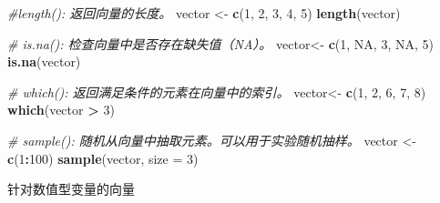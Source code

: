 \documentclass[]{book}
\newenvironment{Shaded}{\begin{snugshade}}{\end{snugshade}}
\newcommand{\CommentTok}[1]{\textcolor[rgb]{0.56,0.35,0.01}{\textit{#1}}}
\newcommand{\DataTypeTok}[1]{\textcolor[rgb]{0.13,0.29,0.53}{#1}}
\newcommand{\DecValTok}[1]{\textcolor[rgb]{0.00,0.00,0.81}{#1}}
\newcommand{\KeywordTok}[1]{\textcolor[rgb]{0.13,0.29,0.53}{\textbf{#1}}}
\newcommand{\NormalTok}[1]{#1}
\newcommand{\OperatorTok}[1]{\textcolor[rgb]{0.81,0.36,0.00}{\textbf{#1}}}
\newcommand{\OtherTok}[1]{\textcolor[rgb]{0.56,0.35,0.01}{#1}}
\newcommand{\StringTok}[1]{\textcolor[rgb]{0.31,0.60,0.02}{#1}}
\begin{document}
\begin{Shaded}
\begin{Highlighting}[]
\CommentTok{#length(): 返回向量的长度。}
\NormalTok{vector <-}\StringTok{ }\KeywordTok{c}\NormalTok{(}\DecValTok{1}\NormalTok{, }\DecValTok{2}\NormalTok{, }\DecValTok{3}\NormalTok{, }\DecValTok{4}\NormalTok{, }\DecValTok{5}\NormalTok{)}
\KeywordTok{length}\NormalTok{(vector)}

\CommentTok{# is.na(): 检查向量中是否存在缺失值（NA）。}
\NormalTok{vector<-}\StringTok{ }\KeywordTok{c}\NormalTok{(}\DecValTok{1}\NormalTok{, }\OtherTok{NA}\NormalTok{, }\DecValTok{3}\NormalTok{, }\OtherTok{NA}\NormalTok{, }\DecValTok{5}\NormalTok{)}
\KeywordTok{is.na}\NormalTok{(vector)}

\CommentTok{# which(): 返回满足条件的元素在向量中的索引。}
\NormalTok{vector<-}\StringTok{ }\KeywordTok{c}\NormalTok{(}\DecValTok{1}\NormalTok{, }\DecValTok{2}\NormalTok{, }\DecValTok{6}\NormalTok{, }\DecValTok{7}\NormalTok{, }\DecValTok{8}\NormalTok{)}
\KeywordTok{which}\NormalTok{(vector }\OperatorTok{>}\StringTok{ }\DecValTok{3}\NormalTok{)}

\CommentTok{# sample(): 随机从向量中抽取元素。可以用于实验随机抽样。}
\NormalTok{vector <-}\StringTok{ }\KeywordTok{c}\NormalTok{(}\DecValTok{1}\OperatorTok{:}\DecValTok{100}\NormalTok{)}
\KeywordTok{sample}\NormalTok{(vector, }\DataTypeTok{size =} \DecValTok{3}\NormalTok{)}
\end{Highlighting}
\end{Shaded}

针对数值型变量的向量
\end{document}
